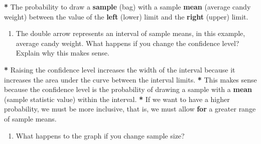 \documentclass[a4paper]{book}
\newenvironment{Shaded}{\begin{snugshade}}{\end{snugshade}}
\newcommand{\KeywordTok}[1]{\textcolor[rgb]{0,0,0}{\textbf{#1}}}
\newcommand{\DecValTok}[1]{\textcolor[rgb]{0.00,0.00,0.00}{#1}}
\newcommand{\StringTok}[1]{\textcolor[rgb]{0.00,0.00,0.00}{#1}}
\newcommand{\ControlFlowTok}[1]{\textcolor[rgb]{0.00,0.00,0.00}{\textbf{#1}}}
\newcommand{\OperatorTok}[1]{\textcolor[rgb]{0.00,0.00,0.00}{\textbf{#1}}}
\newcommand{\NormalTok}[1]{#1}
\providecommand{\tightlist}{%
  \setlength{\itemsep}{0pt}\setlength{\parskip}{0pt}}
\theoremstyle{definition}
\theoremstyle{definition}
\theoremstyle{definition}
\theoremstyle{remark}
\begin{document}
\begin{Shaded}
\begin{Highlighting}[]
\OperatorTok{*}\StringTok{ }\NormalTok{The probability to draw a }\KeywordTok{sample}\NormalTok{ (bag) with a sample }\KeywordTok{mean}\NormalTok{ (average candy}
\NormalTok{weight) between the value of the }\KeywordTok{left}\NormalTok{ (lower) limit and the }\KeywordTok{right}\NormalTok{ (upper)}
\NormalTok{limit.}
\end{Highlighting}
\end{Shaded}

\begin{enumerate}
\def\labelenumi{\arabic{enumi}.}
\setcounter{enumi}{2}
\tightlist
\item
  The double arrow represents an interval of sample means, in this
  example, average candy weight. What happens if you change the
  confidence level? Explain why this makes sense.
\end{enumerate}

\begin{Shaded}
\begin{Highlighting}[]
\OperatorTok{*}\StringTok{ }\NormalTok{Raising the confidence level increases the width of the interval because it}
\NormalTok{increases the area under the curve between the interval limits.}
\OperatorTok{*}\StringTok{ }\NormalTok{This makes sense because the confidence level is the probability of drawing}
\NormalTok{a sample with a }\KeywordTok{mean}\NormalTok{ (sample statistic value) within the interval.}
\OperatorTok{*}\StringTok{ }\NormalTok{If we want to have a higher probability, we must be more inclusive, that is,}
\NormalTok{we must allow }\ControlFlowTok{for}\NormalTok{ a greater range of sample means.}
\end{Highlighting}
\end{Shaded}

\begin{enumerate}
\def\labelenumi{\arabic{enumi}.}
\setcounter{enumi}{3}
\tightlist
\item
  What happens to the graph if you change sample size?
\end{enumerate}

\begin{Shaded}
\end{Shaded}
\end{document}
